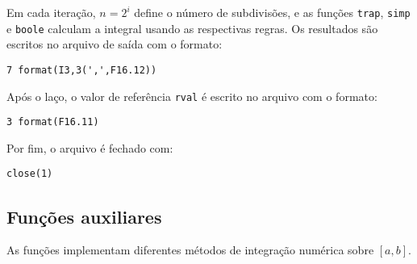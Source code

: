 \noindent
Em cada iteração, $n = 2^i$ define o número de subdivisões, e as funções 
\texttt{trap}, \texttt{simp} e \texttt{boole} calculam a integral usando 
as respectivas regras. Os resultados são escritos no arquivo de saída com o formato:

\vspace*{1\baselineskip}
\begin{lstlisting}
7 format(I3,3(',',F16.12))
\end{lstlisting}

\noindent
Após o laço, o valor de referência \texttt{rval} é escrito no arquivo com o formato:

\vspace*{1\baselineskip}
\begin{lstlisting}
3 format(F16.11)
\end{lstlisting}

\noindent
Por fim, o arquivo é fechado com:

\vspace*{1\baselineskip}
\begin{lstlisting}
close(1)
\end{lstlisting}

\subsection*{Funções auxiliares}

As funções implementam diferentes métodos de integração numérica sobre $[a,b]$.

